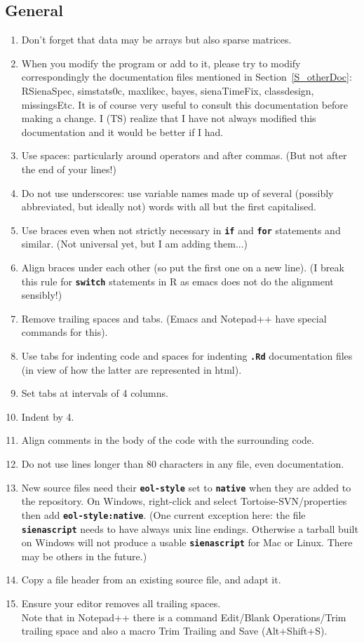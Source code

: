 \documentclass[12pt, a4paper]{article}
\renewcommand{\=}{\,=\,}
\newcommand{\+}{\,+\,}
\newcommand{\sfn}[1]{\textbf{\texttt{#1}}}
\begin{document}
\subsection{General}
\begin{enumerate}
\item Don't forget that data may be arrays but also sparse matrices.
\item When you modify the program or add to it, please try to modify
      correspondingly
      the documentation files mentioned in Section~\ref{S_otherDoc}:
      RSienaSpec, simstats0c, maxlikec, bayes, sienaTimeFix, classdesign,
      missingsEtc.
      It is of course very useful to consult this documentation before making
      a change.
      I (TS) realize that I have not always modified this documentation
      and it would be better if I had.
\item Use spaces: particularly around operators and after commas. (But
  not after the end of your lines!)
\item Do not use underscores: use variable names made up of several (possibly
  abbreviated, but ideally not) words with all but the first capitalised.
\item Use braces even when not strictly necessary in \sfn{if} and \sfn{for}
  statements and similar. (Not universal yet, but I am adding them...)
\item Align braces under each other (so put the first one on a new line). (I
  break this rule for \sfn{switch} statements in R as emacs does not do the
  alignment sensibly!)
\item Remove trailing spaces and tabs. (Emacs and Notepad++ have special
  commands for this).
\item Use tabs for indenting code and spaces for indenting \sfn{.Rd}
  documentation files (in view of how the latter are represented in html).
\item Set tabs at intervals of 4 columns.
\item Indent by 4.
\item Align comments in the body of the code with the surrounding code.
\item Do not use lines longer than 80 characters in any file, even
  documentation.
\item New source files need their \sfn{eol-style} set to \sfn{native} when they
  are added to the repository. On Windows, right-click and select
  Tortoise-SVN/properties then add \sfn{eol-style:native}.  (One current
  exception here: the file \sfn{sienascript} needs to have always unix line
  endings. Otherwise a tarball built on Windows will not produce a usable
  \sfn{sienascript} for Mac or Linux. There may be others in the future.)
\item Copy a file header from an existing source file, and adapt it.
\item Ensure your editor removes all trailing spaces.\\
  Note that in Notepad++ there is a command Edit/Blank Operations/Trim trailing
  space and also a macro Trim Trailing and Save (Alt+Shift+S).
\end{enumerate}
\end{document}
